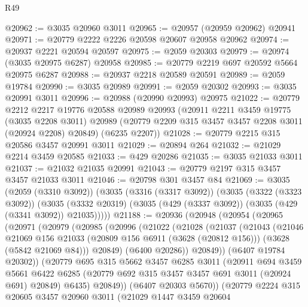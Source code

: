 \begin{lexlean}{R49}
\begin{coremodule}
@20962 := @3035 @20960 @3011
@20965 := @20957 (@20959 @20962) @20941
@20971 := @20779 @2222 @2226 @20598 @20607 @20958 @20962
@20974 := @20937 @2221 @20594 @20597
@20975 := @2059 @20303
@20979 := @20974 (@3035 @20975 @6287) @20958
@20985 := @20779 @2219 @697 @20592 @5664 @20975 @6287
@20988 := @20937 @2218 @20589 @20591
@20989 := @2059 @19784
@20990 := @3035 @20989
@20991 := @2059 @20302
@20993 := @3035 @20991 @3011
@20996 := @20988 (@20990 @20993) @20975
@21022 := @20779
    @2212
    @2217
    @19776
    @20588
    @20989
    @20993
    (@20911
      @2211
      @3459
      @19775
      (@3035 @2208 @3011)
      @20989
      (@20779 @2209 @315 @3457 @3457 @2208 @3011 (@20924 @2208) @20849)
      (@6235 @2207))
@21028 := @20779 @2215 @315 @20586 @3457 @20991 @3011
@21029 := @20894 @264
@21032 := @21029 @2214 @3459 @20585
@21033 := @429 @20286
@21035 := @3035 @21033 @3011
@21037 := @21032 @21035 @20991
@21043 := @20779 @2197 @315 @3457 @3457 @21033 @3011
@21046 := @20798 @301 @3457 @84
@21069 := @3035
    (@2059 (@3310 @3092))
    (@3035
      (@3316 (@3317 @3092))
      (@3035
        (@3322 (@3323 @3092))
        (@3035 (@3332 @20319) (@3035 (@429 (@3337 @3092)) (@3035 (@429 (@3341 @3092)) @21035)))))
@21188 := @20936
    (@20948
      (@20954
        (@20965
          (@20971
            (@20979
              (@20985
                (@20996
                  (@21022
                    (@21028
                      (@21037
                        (@21043
                          (@21046
                            @21069
                            @156
                            @21033
                            (@20809 @156 @6911 (@3628 (@20812 @156)))
                            (@3628 (@5842 @21069 @84)))
                          @20849)
                        (@6400 @20286))
                      @20849))
                  (@6407 @19784 @20302))
                (@20779
                  @695
                  @315
                  @5662
                  @3457
                  @6285
                  @3011
                  (@20911
                    @694
                    @3459
                    @5661
                    @6422
                    @6285
                    (@20779 @692 @315 @3457 @3457 @691 @3011 (@20924 @691) @20849)
                    @6435)
                  @20849))
              (@6407 @20303 @5670))
            (@20779
              @2224
              @315
              @20605
              @3457
              @20960
              @3011
              (@21029
                @1447
                @3459
                @20604

\end{coremodule}
\end{lexlean}
